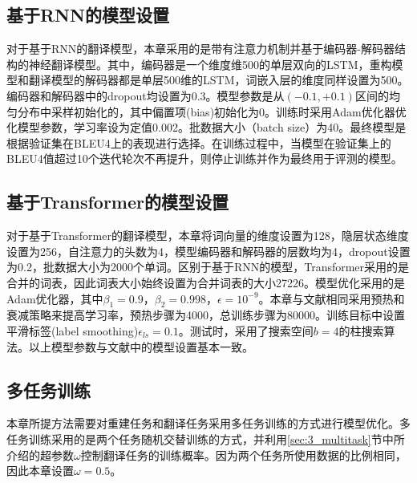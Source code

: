 \subsection{基于RNN的模型设置}
\label{sec:3_rnn_setup}
对于基于RNN的翻译模型，本章采用的是带有注意力机制并基于编码器-解码器结构的神经翻译模型\cite{4_luong-etal-2015-effective}。其中，编码器是一个维度维500的单层双向的LSTM，重构模型和翻译模型的解码器都是单层500维的LSTM，词嵌入层的维度同样设置为500。编码器和解码器中的dropout均设置为0.3。模型参数是从$(-0.1,+0.1)$区间的均匀分布中采样初始化的，其中偏置项(bias)初始化为0。训练时采用Adam\cite{34_DBLP:journals/corr/KingmaB14}优化器优化模型参数，学习率设为定值0.002。批数据大小（batch size）为40。最终模型是根据验证集在BLEU4\cite{42_papineni-etal-2002-bleu}上的表现进行选择。在训练过程中，当模型在验证集上的BLEU4值超过10个迭代轮次不再提升，则停止训练并作为最终用于评测的模型。

\subsection{基于Transformer的模型设置}
\label{sec:3_transformer_setup}
对于基于Transformer\cite{5_DBLP:journals/corr/VaswaniSPUJGKP17}的翻译模型，本章将词向量的维度设置为128，隐层状态维度设置为256，自注意力的头数为4，模型编码器和解码器的层数均为4，dropout设置为0.2，批数据大小为2000个单词。区别于基于RNN的模型，Transformer采用的是合并的词表，因此词表大小始终设置为合并词表的大小27226。模型优化采用的是Adam优化器，其中$\beta_1=0.9$，$\beta_2=0.998$，$\epsilon=10^{-9}$。本章与文献\cite{5_DBLP:journals/corr/VaswaniSPUJGKP17}相同采用预热和衰减策略来提高学习率，预热步骤为4000，总训练步骤为80000。训练目标中设置平滑标签(label smoothing)$\epsilon_{ls}=0.1$。测试时，采用了搜索空间$b=4$的柱搜索算法。以上模型参数与文献\cite{33_yin-etal-2020-novel}中的模型设置基本一致。

\subsection{多任务训练}
本章所提方法需要对重建任务和翻译任务采用多任务训练的方式进行模型优化。多任务训练采用的是两个任务随机交替训练的方式，并利用\ref{sec:3_multitask}节中所介绍的超参数$\omega$控制翻译任务的训练概率。因为两个任务所使用数据的比例相同，因此本章设置$\omega=0.5$。

